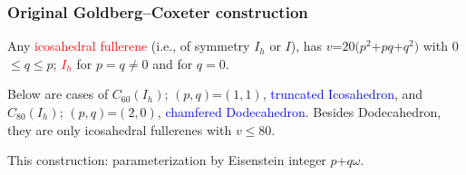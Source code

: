 \documentclass{beamer}
\begin{document}
\begin{frame}\frametitle{Original Goldberg--Coxeter construction}
\vspace{-2mm}
Any \textcolor{red}{icosahedral fullerene} (i.e., of symmetry $I_h$ or $I$),
has $v$=$20(p^2$+$pq$+$q^2)$ 
 with $0$$ \le $$q $$\le p$; \textcolor{red}{$I_h$} for $p=q\not= 0$ and for $q=0$.

Below are cases of  $C_{60}(I_h)$; $(p,q)$=$(1,1)$,
\textcolor{blue}{truncated Icosahedron}, and   $C_{80}(I_h)$; $(p,q)$=$(2,0)$,
 \textcolor{blue}{chamfered Dodecahedron}.
Besides Dodecahedron,  
they are only icosahedral
 fullerenes with $v \le 80$.
 \vspace{-1.6cm}
 
 

\begin{center}\begin{minipage}{4.5cm}
\bigskip
\end{minipage}
\begin{minipage}{61mm}


 \end{minipage}\vspace{-13mm}

This construction:
 parameterization by Eisenstein integer $p$+$q\omega$.
\end{center}



\end{frame}
\end{document}

